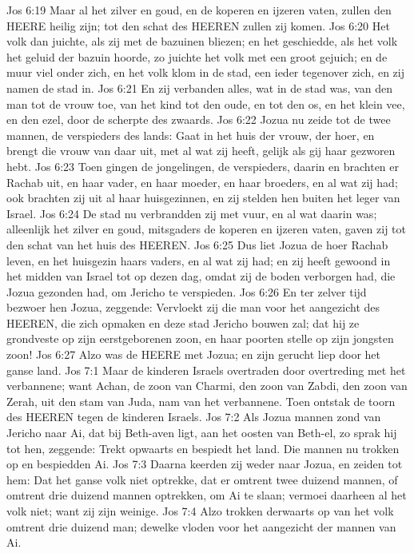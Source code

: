Jos 6:19  Maar al het zilver en goud, en de koperen en ijzeren vaten, zullen den HEERE heilig zijn; tot den schat des HEEREN zullen zij komen.
Jos 6:20  Het volk dan juichte, als zij met de bazuinen bliezen; en het geschiedde, als het volk het geluid der bazuin hoorde, zo juichte het volk met een groot gejuich; en de muur viel onder zich, en het volk klom in de stad, een ieder tegenover zich, en zij namen de stad in.
Jos 6:21  En zij verbanden alles, wat in de stad was, van den man tot de vrouw toe, van het kind tot den oude, en tot den os, en het klein vee, en den ezel, door de scherpte des zwaards.
Jos 6:22  Jozua nu zeide tot de twee mannen, de verspieders des lands: Gaat in het huis der vrouw, der hoer, en brengt die vrouw van daar uit, met al wat zij heeft, gelijk als gij haar gezworen hebt.
Jos 6:23  Toen gingen de jongelingen, de verspieders, daarin en brachten er Rachab uit, en haar vader, en haar moeder, en haar broeders, en al wat zij had; ook brachten zij uit al haar huisgezinnen, en zij stelden hen buiten het leger van Israel.
Jos 6:24  De stad nu verbrandden zij met vuur, en al wat daarin was; alleenlijk het zilver en goud, mitsgaders de koperen en ijzeren vaten, gaven zij tot den schat van het huis des HEEREN.
Jos 6:25  Dus liet Jozua de hoer Rachab leven, en het huisgezin haars vaders, en al wat zij had; en zij heeft gewoond in het midden van Israel tot op dezen dag, omdat zij de boden verborgen had, die Jozua gezonden had, om Jericho te verspieden.
Jos 6:26  En ter zelver tijd bezwoer hen Jozua, zeggende: Vervloekt zij die man voor het aangezicht des HEEREN, die zich opmaken en deze stad Jericho bouwen zal; dat hij ze grondveste op zijn eerstgeborenen zoon, en haar poorten stelle op zijn jongsten zoon!
Jos 6:27  Alzo was de HEERE met Jozua; en zijn gerucht liep door het ganse land.
Jos 7:1  Maar de kinderen Israels overtraden door overtreding met het verbannene; want Achan, de zoon van Charmi, den zoon van Zabdi, den zoon van Zerah, uit den stam van Juda, nam van het verbannene. Toen ontstak de toorn des HEEREN tegen de kinderen Israels.
Jos 7:2  Als Jozua mannen zond van Jericho naar Ai, dat bij Beth-aven ligt, aan het oosten van Beth-el, zo sprak hij tot hen, zeggende: Trekt opwaarts en bespiedt het land. Die mannen nu trokken op en bespiedden Ai.
Jos 7:3  Daarna keerden zij weder naar Jozua, en zeiden tot hem: Dat het ganse volk niet optrekke, dat er omtrent twee duizend mannen, of omtrent drie duizend mannen optrekken, om Ai te slaan; vermoei daarheen al het volk niet; want zij zijn weinige.
Jos 7:4  Alzo trokken derwaarts op van het volk omtrent drie duizend man; dewelke vloden voor het aangezicht der mannen van Ai.
